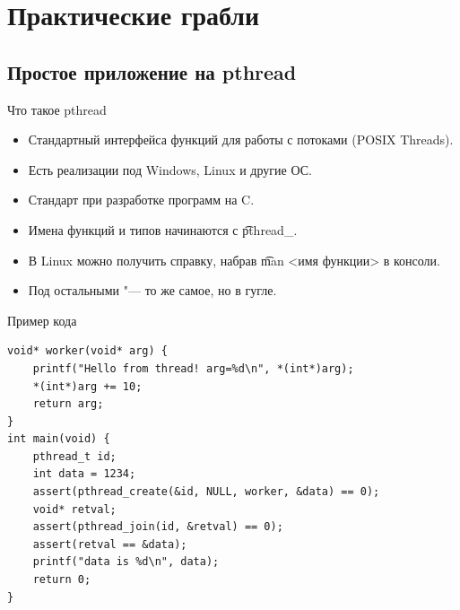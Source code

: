 \section{Практические грабли}
\subsection{Простое приложение на pthread}

\begin{frame}
\end{frame}

\begin{frame}{Что такое pthread}
	\begin{itemize}
		\item Стандартный интерфейса функций для работы с потоками (POSIX Threads).
		\item Есть реализации под Windows, Linux и другие ОС.
		\item Стандарт при разработке программ на C.
		\item Имена функций и типов начинаются с \t{pthread\_}.
		\item В Linux можно получить справку, набрав \t{man <имя функции>} в консоли.
		\item Под остальными "--- то же самое, но в гугле.
	\end{itemize}
\end{frame}

\begin{frame}[fragile]{Пример кода}
\begin{verbatim}
void* worker(void* arg) {
    printf("Hello from thread! arg=%d\n", *(int*)arg);
    *(int*)arg += 10;
    return arg;
}
int main(void) {
    pthread_t id;
    int data = 1234;
    assert(pthread_create(&id, NULL, worker, &data) == 0);
    void* retval;
    assert(pthread_join(id, &retval) == 0);
    assert(retval == &data);
    printf("data is %d\n", data);
    return 0;
}
\end{verbatim}
\end{frame}

